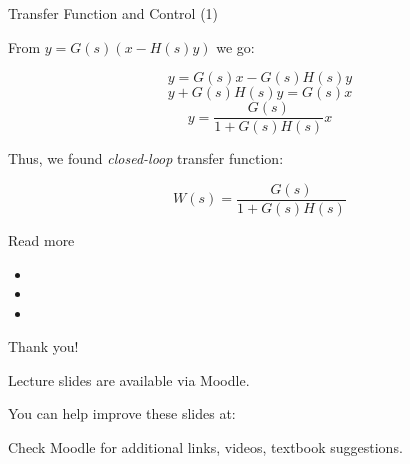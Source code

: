 \documentclass{beamer}
\begin{document}
\begin{frame}{Transfer Function and Control (1)}
	\begin{flushleft}
		
		From $y = G(s) (x - H(s) y)$ we go:
		
		\begin{equation}
			y = G(s)x - G(s)H(s) y
		\end{equation}
		\begin{equation}
			y + G(s)H(s) y = G(s)x
		\end{equation}
		\begin{equation}
			y = \frac{G(s)}{1 + G(s)H(s)} x
		\end{equation}
		
		Thus, we found \emph{closed-loop} transfer function:
		
		\begin{equation}
			W(s) = \frac{G(s)}{1 + G(s)H(s)}
		\end{equation}
		
	\end{flushleft}
\end{frame}



\begin{frame}{Read more}

\begin{itemize}
\item {}

\item {}

\item {}

\end{itemize}

\end{frame}



\begin{frame}{Thank you!}
\centerline{Lecture slides are available via Moodle.}
\bigskip
\centerline{You can help improve these slides at:}
\centerline{\mygit}
\bigskip
\centerline{Check Moodle for additional links, videos, textbook suggestions.}
\bigskip

\centerline{\textcolor{black}{}}
\end{frame}
\end{document}
